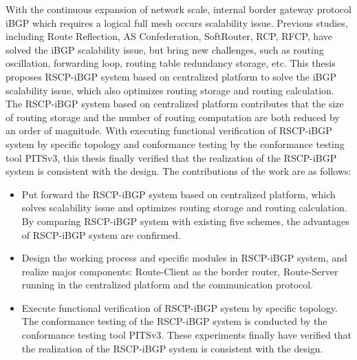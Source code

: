 \begin{eabstract}
   With the continuous expansion of network scale, internal border gateway protocol iBGP which requires a logical full mesh occurs scalability issue. Previous studies, including Route Reflection, AS Confederation, SoftRouter, RCP, RFCP, have solved the iBGP scalability issue, but bring new challenges, such as routing oscillation, forwarding loop, routing table redundancy storage, etc. This thesis proposes RSCP-iBGP system based on centralized platform to solve the iBGP scalability issue, which also optimizes routing storage and routing calculation. The RSCP-iBGP system based on centralized platform contributes that the size of routing storage and the number of routing computation are both reduced by an order of magnitude. With executing functional verification of RSCP-iBGP system by specific topology and conformance testing by the conformance testing tool PITSv3, this thesis finally verified that the realization of the RSCP-iBGP system is consistent with the design. The contributions of the work are as follows:

   \begin{itemize}
    \item Put forward the RSCP-iBGP system based on centralized platform, which solves scalability issue and optimizes routing storage and routing calculation. By comparing RSCP-iBGP system with existing five schemes, the advantages of RSCP-iBGP system are confirmed.
    \item Design the working process and specific modules in RSCP-iBGP system, and realize major components: Route-Client as the border router, Route-Server running in the centralized platform and the communication protocol.
    \item Execute functional verification of RSCP-iBGP system by specific topology. The conformance testing of the RSCP-iBGP system is conducted by the conformance testing tool PITSv3. These experiments finally have verified that the realization of the RSCP-iBGP system is consistent with the design.
  \end{itemize}
\end{eabstract}




